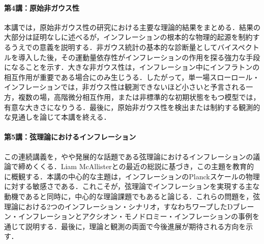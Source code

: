 \paragraph{第4講：原始非ガウス性}
本講では，原始非ガウス性の研究における主要な理論的結果をまとめる．結果の大部分は証明なしに述べるが，インフレーションの根本的な物理的起源を制約するうえでの意義を説明する．非ガウス統計の基本的な診断量としてバイスペクトルを導入した後，その運動量依存性がインフレーションの作用を探る強力な手段になることを示す．大きな非ガウス性は，インフレーション中にインフラトンの相互作用が重要である場合にのみ生じうる．したがって，単一場スローロール・インフレーションでは，非ガウス性は観測できないほど小さいと予言される一方，複数の場，高階微分相互作用，または非標準的な初期状態をもつ模型では，有意な大きさになりうる．最後に，原始非ガウス性を検出または制約する観測的な見通しを論じて本講を終える．

\paragraph{第5講：弦理論におけるインフレーション}
この連続講義を，やや発展的な話題である弦理論におけるインフレーションの議論で締めくくる．Liam McAllisterとの最近の総説に基づき，この主題を教育的に概観する．本講の中心的な主題は，インフレーションのPlanckスケールの物理に対する敏感さである．これこそが，弦理論でインフレーションを実現する主な動機であると同時に，中心的な理論課題でもあると論じる．これらの問題を，弦理論における2つのインフレーション・シナリオ，すなわちワープしたDブレーン・インフレーションとアクシオン・モノドロミー・インフレーションの事例を通じて説明する．最後に，理論と観測の両面で今後進展が期待される方向を示す．

\vspace{1em}
\setcounter{footnote}{0}
\clearpage
\hypertarget{toc}{}
\tableofcontents
\clearpage
